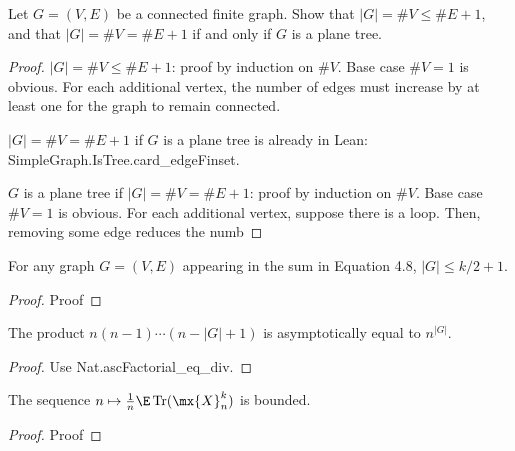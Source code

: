 



\begin{proposition}
  \label{prop:4_3_1}
  \notready
  Let $G=(V,E)$ be a connected finite graph. Show that $|G|=\#V\le \#E+1$, and that $|G|=\#V=\#E+1$ if and only if $G$ is a plane tree.
\end{proposition}

\begin{proof}
  \notready
  $|G|= \#V\le \#E+1$: proof by induction on $\#V$. Base case $\#V = 1$ is obvious. For each additional vertex, the number of edges must increase by at least one for the graph to remain connected.

  $|G|=\#V=\#E+1$ if $G$ is a plane tree is already in Lean: SimpleGraph.IsTree.card_edgeFinset.

  $G$ is a plane tree if $|G|=\#V=\#E+1$: proof by induction on $\#V$. Base case $\#V = 1$ is obvious. For each additional vertex, suppose there is a loop. Then, removing some edge reduces the numb
\end{proof}


\begin{lemma}
  \label{lemma:vertex_bound}
  \notready
  For any graph $G = (V, E)$ appearing in the sum in Equation 4.8, $|G| \le k/2 + 1$.
\end{lemma}

\begin{proof}
  \notready
  Proof
\end{proof}



\begin{lemma}
  \label{lemma:factorial_product}
  \notready
  The product $n(n-1)\cdots (n-|G|+1)$ is asymptotically equal to $n^{|G|}$.

\end{lemma}

\begin{proof}
  \notready
  Use Nat.ascFactorial_eq_div.
\end{proof}



\begin{lemma}
  \label{lemma:bounded_map}
  \notready
  The sequence $n\mapsto \frac1n\E\Tr(\mx{X}_n^k)$ is bounded.
\end{lemma}

\begin{proof}
  \notready
  Proof
\end{proof}



